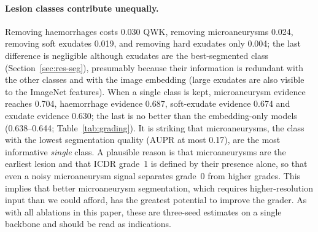 \paragraph{Lesion classes contribute unequally.} Removing haemorrhages costs 0.030 QWK, removing microaneurysms 0.024, removing soft exudates 0.019, and removing hard exudates only 0.004; the last difference is negligible although exudates are the best-segmented class (Section~\ref{sec:res-seg}), presumably because their information is redundant with the other classes and with the image embedding (large exudates are also visible to the ImageNet features). When a single class is kept, microaneurysm evidence reaches 0.704, haemorrhage evidence 0.687, soft-exudate evidence 0.674 and exudate evidence 0.630; the last is no better than the embedding-only models (0.638--0.644; Table~\ref{tab:grading}). It is striking that microaneurysms, the class with the lowest segmentation quality (AUPR at most 0.17), are the most informative \emph{single} class. A plausible reason is that microaneurysms are the earliest lesion and that ICDR grade~1 is defined by their presence alone, so that even a noisy microaneurysm signal separates grade~0 from higher grades. This implies that better microaneurysm segmentation, which requires higher-resolution input than we could afford, has the greatest potential to improve the grader. As with all ablations in this paper, these are three-seed estimates on a single backbone and should be read as indications.


